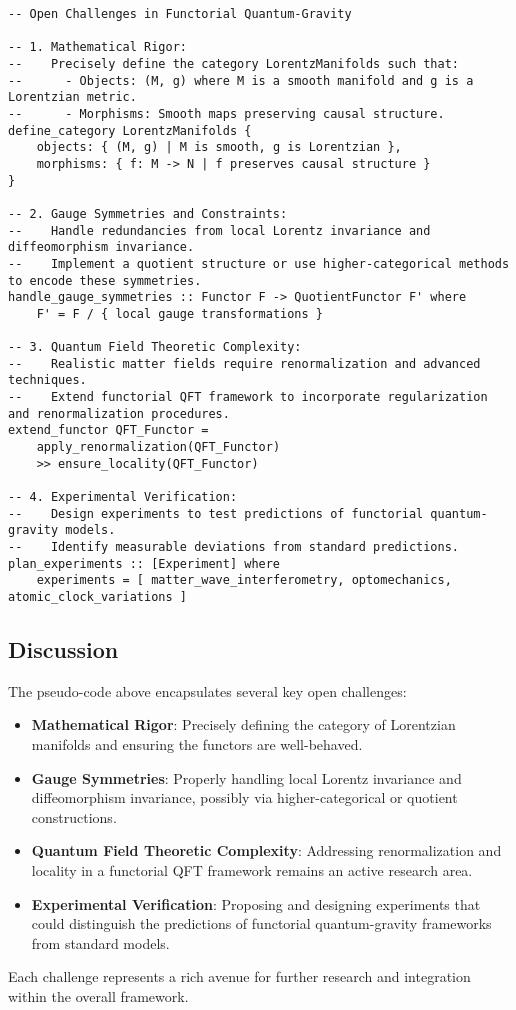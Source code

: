 \documentclass[12pt]{article}
\begin{document}
\begin{lstlisting}[caption={Pseudo-code listing of open challenges}, basicstyle=\ttfamily\footnotesize]
-- Open Challenges in Functorial Quantum-Gravity

-- 1. Mathematical Rigor:
--    Precisely define the category LorentzManifolds such that:
--      - Objects: (M, g) where M is a smooth manifold and g is a Lorentzian metric.
--      - Morphisms: Smooth maps preserving causal structure.
define_category LorentzManifolds {
    objects: { (M, g) | M is smooth, g is Lorentzian },
    morphisms: { f: M -> N | f preserves causal structure }
}

-- 2. Gauge Symmetries and Constraints:
--    Handle redundancies from local Lorentz invariance and diffeomorphism invariance.
--    Implement a quotient structure or use higher-categorical methods to encode these symmetries.
handle_gauge_symmetries :: Functor F -> QuotientFunctor F' where
    F' = F / { local gauge transformations }

-- 3. Quantum Field Theoretic Complexity:
--    Realistic matter fields require renormalization and advanced techniques.
--    Extend functorial QFT framework to incorporate regularization and renormalization procedures.
extend_functor QFT_Functor = 
    apply_renormalization(QFT_Functor)
    >> ensure_locality(QFT_Functor)

-- 4. Experimental Verification:
--    Design experiments to test predictions of functorial quantum-gravity models.
--    Identify measurable deviations from standard predictions.
plan_experiments :: [Experiment] where
    experiments = [ matter_wave_interferometry, optomechanics, atomic_clock_variations ]
\end{lstlisting}

\subsection{Discussion}
The pseudo-code above encapsulates several key open challenges:
\begin{itemize}
    \item \textbf{Mathematical Rigor}: Precisely defining the category of Lorentzian manifolds and ensuring the functors are well-behaved.
    \item \textbf{Gauge Symmetries}: Properly handling local Lorentz invariance and diffeomorphism invariance, possibly via higher-categorical or quotient constructions.
    \item \textbf{Quantum Field Theoretic Complexity}: Addressing renormalization and locality in a functorial QFT framework remains an active research area.
    \item \textbf{Experimental Verification}: Proposing and designing experiments that could distinguish the predictions of functorial quantum-gravity frameworks from standard models.
\end{itemize}
Each challenge represents a rich avenue for further research and integration within the overall framework.
\end{document}
